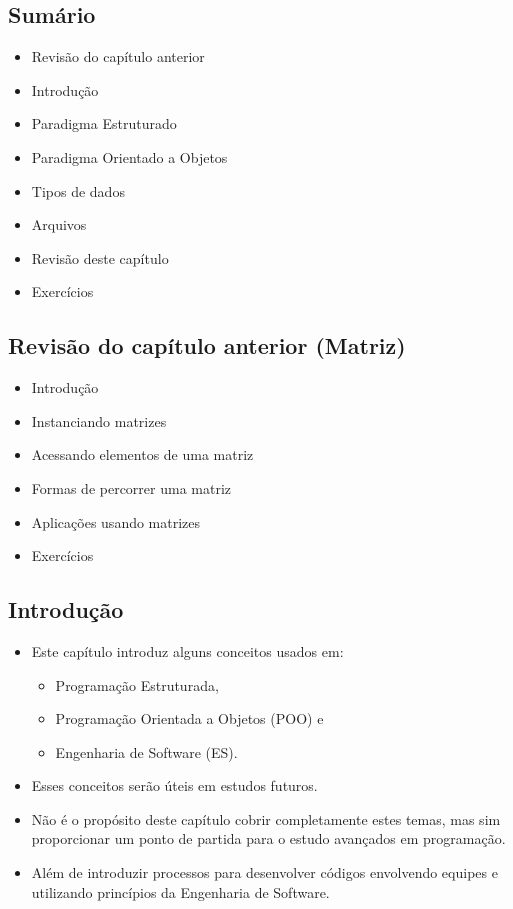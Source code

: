 \documentclass[12pt,a4paper]{article}
\providecommand{\tightlist}{%
      \setlength{\itemsep}{0pt}\setlength{\parskip}{0pt}}
\begin{document}
    \hypertarget{sumuxe1rio}{%
\subsection{Sumário}\label{sumuxe1rio}}

\begin{itemize}
\tightlist
\item
  Revisão do capítulo anterior
\item
  Introdução
\item
  Paradigma Estruturado
\item
  Paradigma Orientado a Objetos
\item
  Tipos de dados
\item
  Arquivos
\item
  Revisão deste capítulo
\item
  Exercícios
\end{itemize}

    \hypertarget{revisuxe3o-do-capuxedtulo-anterior-matriz}{%
\subsection{Revisão do capítulo anterior
(Matriz)}\label{revisuxe3o-do-capuxedtulo-anterior-matriz}}

    \begin{itemize}
\tightlist
\item
  Introdução
\item
  Instanciando matrizes
\item
  Acessando elementos de uma matriz
\item
  Formas de percorrer uma matriz
\item
  Aplicações usando matrizes
\item
  Exercícios
\end{itemize}

    \hypertarget{introduuxe7uxe3o}{%
\subsection{Introdução}\label{introduuxe7uxe3o}}

    \begin{itemize}
\tightlist
\item
  Este capítulo introduz alguns conceitos usados em:

  \begin{itemize}
  \tightlist
  \item
    Programação Estruturada,
  \item
    Programação Orientada a Objetos (POO) e
  \item
    Engenharia de Software (ES).
  \end{itemize}
\item
  Esses conceitos serão úteis em estudos futuros.
\item
  Não é o propósito deste capítulo cobrir completamente estes temas, mas
  sim proporcionar um ponto de partida para o estudo avançados em
  programação.
\item
  Além de introduzir processos para desenvolver códigos envolvendo
  equipes e utilizando princípios da Engenharia de Software.
\end{itemize}
\end{document}
